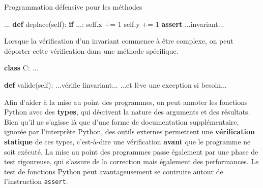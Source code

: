 \documentclass[a4paper,17pt]{extarticle}
\newenvironment{Shaded}{}{}
\newcommand{\KeywordTok}[1]{\textcolor[rgb]{0.00,0.44,0.13}{\textbf{{#1}}}}
\newcommand{\DecValTok}[1]{\textcolor[rgb]{0.25,0.63,0.44}{{#1}}}
\newcommand{\StringTok}[1]{\textcolor[rgb]{0.25,0.44,0.63}{{#1}}}
\newcommand{\NormalTok}[1]{{#1}}
\newcommand{\VariableTok}[1]{\textcolor[rgb]{0.10,0.09,0.49}{{#1}}}
\newcommand{\ControlFlowTok}[1]{\textcolor[rgb]{0.00,0.44,0.13}{\textbf{{#1}}}}
\newcommand{\OperatorTok}[1]{\textcolor[rgb]{0.40,0.40,0.40}{{#1}}}
\begin{document}
\begin{exemple}
Programmation défensive pour les méthodes

\begin{Shaded}
\begin{Highlighting}[]
\NormalTok{    ...}
    \KeywordTok{def}\NormalTok{ deplace(}\VariableTok{self}\NormalTok{):}
        \ControlFlowTok{if}\NormalTok{ ...:}
            \VariableTok{self}\NormalTok{.x }\OperatorTok{+=} \DecValTok{1}
            \VariableTok{self}\NormalTok{.y }\OperatorTok{+=} \DecValTok{1}
        \ControlFlowTok{assert}\NormalTok{ ...invariant...}
\end{Highlighting}
\end{Shaded}

        \end{exemple}\begin{exemple}
    Lorsque la vérification d'un invariant commence à être complexe, on peut
déporter cette vérification dans une méthode spécifique.

\begin{Shaded}
\begin{Highlighting}[]
\KeywordTok{class}\NormalTok{ C:}
\NormalTok{    ...}

    \KeywordTok{def}\NormalTok{ valide(}\VariableTok{self}\NormalTok{):}
\NormalTok{        ...vérifie l}\StringTok{\textquotesingle{}invariant...}
\StringTok{        ...et lève une exception si besoin...}
\end{Highlighting}
\end{Shaded}

        \end{exemple}
    Afin d'aider à la mise au point des programmes, on peut annoter les
fonctions Python avec des \textbf{types}, qui décrivent la nature des
arguments et des résultats. Bien qu'il ne s'agisse là que d'une forme de
documentation supplémentaire, ignorée par l'interprète Python, des
outils externes permettent une \textbf{vérification statique} de ces
types, c'est-à-dire une vérification \textbf{avant} que le programme ne
soit exécuté. La mise au point des programmes passe également par une
phase de test rigoureuse, qui s'assure de la correction mais également
des performances. Le test de fonctions Python peut avantageusement se
contruire autour de l'instruction \texttt{assert}.


    
    
    
\end{document}
